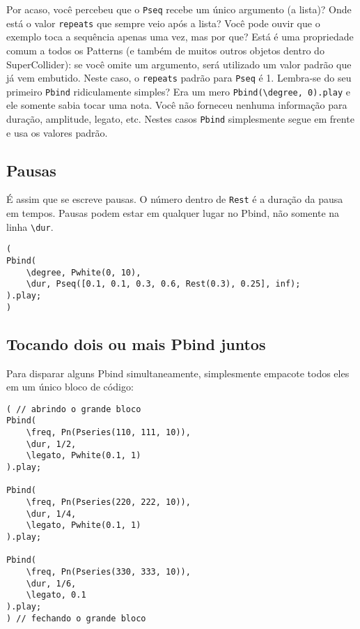 Por acaso, você percebeu que o \texttt{Pseq} recebe um único argumento (a lista)? Onde está o valor \texttt{repeats} que sempre veio após a lista? Você pode ouvir que o exemplo toca a sequência apenas uma vez, mas por que? Está é uma propriedade comum a todos os Patterns (e também de muitos outros objetos dentro do SuperCollider): se você omite um argumento, será utilizado um valor padrão que já vem embutido. Neste caso, o \texttt{repeats} padrão para \texttt{Pseq} é 1. Lembra-se do seu primeiro \texttt{Pbind} ridiculamente simples? Era um mero \texttt{Pbind(\textbackslash degree, 0).play} e ele somente sabia tocar uma nota. Você não forneceu nenhuma informação para duração, amplitude, legato, etc. Nestes casos \texttt{Pbind} simplesmente segue em frente e usa os valores padrão.


\subsection{Pausas}

É assim que se escreve pausas. O número dentro de \texttt{Rest} é a duração da pausa em tempos. Pausas podem estar em qualquer lugar no Pbind, não somente na linha \texttt{\textbackslash dur}.

 
\begin{lstlisting}[style=SuperCollider-IDE, basicstyle=\scttfamily\footnotesize]
(
Pbind(
	\degree, Pwhite(0, 10),
	\dur, Pseq([0.1, 0.1, 0.3, 0.6, Rest(0.3), 0.25], inf);
).play;
)
\end{lstlisting}
 

\subsection{Tocando dois ou mais Pbind juntos}

Para disparar alguns Pbind simultaneamente, simplesmente empacote todos eles em um único bloco de código:
 
\begin{lstlisting}[style=SuperCollider-IDE, basicstyle=\scttfamily\footnotesize]
( // abrindo o grande bloco
Pbind(
	\freq, Pn(Pseries(110, 111, 10)),
	\dur, 1/2,
	\legato, Pwhite(0.1, 1)
).play;

Pbind(
	\freq, Pn(Pseries(220, 222, 10)),
	\dur, 1/4,
	\legato, Pwhite(0.1, 1)
).play;

Pbind(
	\freq, Pn(Pseries(330, 333, 10)),
	\dur, 1/6,
	\legato, 0.1
).play;
) // fechando o grande bloco
\end{lstlisting}

